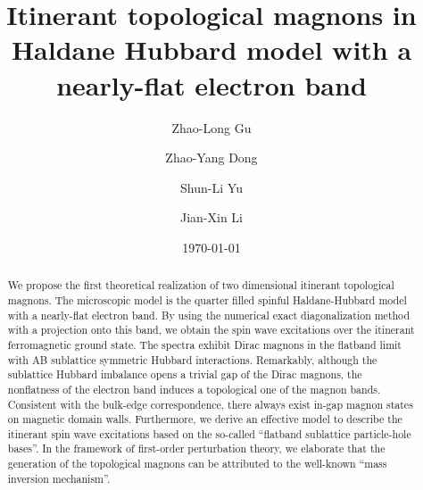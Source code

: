 \documentclass[amsmath,superscriptaddress,showpacs,aps,prl,twocolumn]{revtex4-1}
\begin{document}
\title{Itinerant topological magnons in Haldane Hubbard model with a nearly-flat electron band}
\author{Zhao-Long Gu}
\author{Zhao-Yang Dong}
\author{Shun-Li Yu}
\author{Jian-Xin Li}
\date{\today}

\begin{abstract}

\par We propose the first theoretical realization of two dimensional itinerant topological magnons. The microscopic model is the quarter filled spinful Haldane-Hubbard model with a nearly-flat electron band. By using the numerical exact diagonalization method with a projection onto this band, we obtain the spin wave excitations over the itinerant ferromagnetic ground state. The spectra exhibit Dirac magnons in the flatband limit with AB sublattice symmetric Hubbard interactions. Remarkably, although the sublattice Hubbard imbalance opens a trivial gap of the Dirac magnons, the nonflatness of the electron band induces a topological one of the magnon bands. Consistent with the bulk-edge correspondence, there always exist in-gap magnon states on magnetic domain walls. Furthermore, we derive an effective model to describe the itinerant spin wave excitations based on the so-called ``flatband sublattice particle-hole bases''. In the framework of first-order perturbation theory, we elaborate that the generation of the topological magnons can be attributed to the well-known ``mass inversion mechanism''.

\end{abstract}

\maketitle
\end{document}

